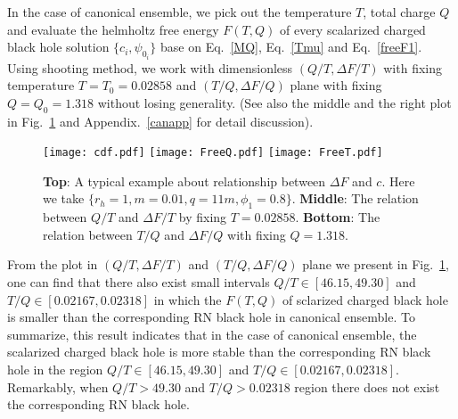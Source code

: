 \documentclass[pr, twocolumn, preprintnumbers, showpacs,footnoteadded, superscriptaddress,nofootinbib,longbibliography]{revtex4-1}
\begin{document}
In the case of canonical ensemble, we pick out the temperature $T$, total charge $Q$ and evaluate the helmholtz free energy $F(T,Q)$ of every scalarized charged black hole solution $\{c_i, \psi_{0_i}\}$ base on Eq.~\eqref{MQ},  Eq.~\eqref{Tmu} and Eq.~\eqref{freeF1}. Using shooting method,
we work with dimensionless $(Q/T, \Delta F/T)$ with fixing temperature $T=T_0=0.02858$ and $(T/Q, \Delta F/Q)$ plane with fixing $Q=Q_0=1.318$ without losing generality. (See also the middle and the right plot in Fig.~\ref{fig3} and Appendix.~\ref{canapp} for detail discussion).
%
\begin{figure}
  \centering
  \texttt{[image: cdf.pdf]}
  \texttt{[image: FreeQ.pdf]}
  \texttt{[image: FreeT.pdf]}
 \caption{\textbf{Top}: A typical example about relationship between $\Delta F$ and $c$. Here we take $\{r_h=1, m=0.01, q=11m, \phi_1=0.8\}$. \textbf{Middle}: The relation between $Q/T$ and $\Delta F/T$ by fixing $T=0.02858$. \textbf{Bottom}: The relation between $T/Q$ and $\Delta F/ Q$ with fixing $Q=1.318$. }\label{fig3}
\end{figure}
%



From the plot in $(Q/T, \Delta F/T)$ and $(T/Q, \Delta F/Q)$ plane we present in Fig.~\ref{fig3}, one can find that there also exist small intervals $Q/T \in [46.15,49.30] $ and $T/Q \in [0.02167,0.02318]$ in which the $F(T,Q)$ of sclarized charged black hole is smaller than the corresponding RN black hole in canonical ensemble. To summarize, this result indicates that in the case of canonical ensemble, the scalarized charged black hole is more stable than the corresponding RN black hole in the region $Q/T \in [46.15,49.30] $ and $T/Q \in [0.02167,0.02318]$. Remarkably, when $Q/T>49.30$ and $T/Q>0.02318$ region there does not exist the corresponding RN black hole.
\end{document}
